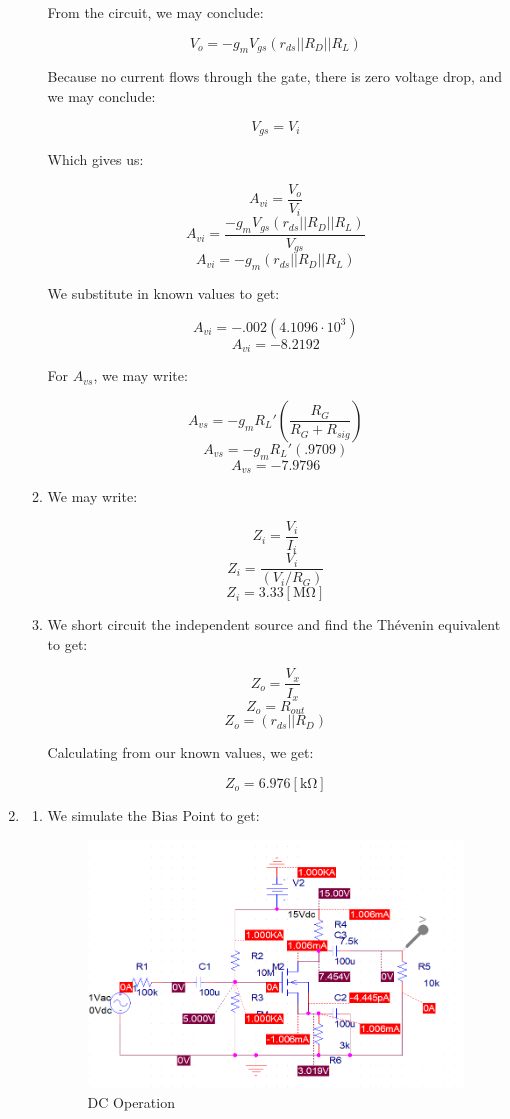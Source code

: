 \begin{enumerate}
\begin{enumerate}
        From the circuit, we may conclude:

        $$V_o=-g_mV_{gs}(r_{ds}||R_D||R_L)$$

        Because no current flows through the gate, there is zero voltage drop, and we may conclude:

        $$V_{gs}=V_i$$

        Which gives us:

        $$A_{vi}=\frac{V_o}{V_i}$$
        $$A_{vi}=\frac{-g_mV_{gs}(r_{ds}||R_D||R_L)}{V_{gs}}$$
        $$A_{vi}=-g_m(r_{ds}||R_D||R_L)$$

        We substitute in known values to get:

        $$A_{vi}=-.002(4.1096\cdot10^3)$$
        $$\boxed{A_{vi}=-8.2192}$$

        For $A_{vs}$, we may write:

        $$A_{vs}=-g_mR_L'\left( \frac{R_G}{R_G+R_{sig}} \right)$$
        $$A_{vs}=-g_mR_L'\left( .9709\right)$$
        $$\boxed{A_{vs}=-7.9796}$$

      \item We may write:

        $$Z_i=\frac{V_i}{I_i}$$
        $$Z_i=\frac{V_i}{(V_i/R_G)}$$
        $$\boxed{Z_i=3.33[\si{\mega\ohm}]}$$

      \item We short circuit the independent source and find the Th\'evenin equivalent to get:

        $$Z_o=\frac{V_x}{I_x}$$
        $$Z_o=R_{out}$$
        $$\boxed{Z_o=(r_{ds}||R_D)}$$

        Calculating from our known values, we get:

        $$\boxed{Z_o=6.976[\si{\kilo\ohm}]}$$

    \end{enumerate}

  \item

    \begin{enumerate}

      \item We simulate the Bias Point to get:

        \begin{figure}[H]
          \centering
          \includegraphics[width=.8\textwidth]{Figures/HW11-4a}
          \caption{DC Operation}
          \label{fig:3}
        \end{figure}


\end{enumerate}
\end{enumerate}
